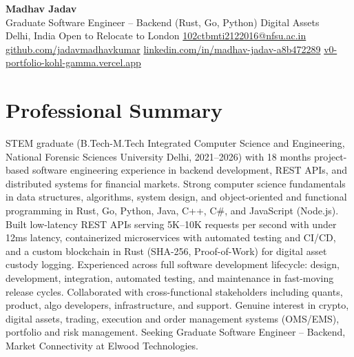 \documentclass[9pt,letterpaper]{article}
\begin{document}
\begin{center}
{\LARGE \textbf{Madhav Jadav}}\\[2pt]
{\small Graduate Software Engineer -- Backend (Rust, Go, Python) \textbar{} Digital Assets}\\[2pt]
{\small Delhi, India \textbar{} Open to Relocate to London \textbar{} \href{mailto:102ctbmti2122016@nfsu.ac.in}{102ctbmti2122016@nfsu.ac.in}}\\[2pt]
{\small \href{https://github.com/jadavmadhavkumar}{github.com/jadavmadhavkumar} \textbar{} \href{https://www.linkedin.com/in/madhav-jadav-a8b472289}{linkedin.com/in/madhav-jadav-a8b472289} \textbar{} \href{http://v0-portfolio-kohl-gamma.vercel.app}{v0-portfolio-kohl-gamma.vercel.app}}\\
\end{center}

\section{Professional Summary}
STEM graduate (B.Tech-M.Tech Integrated Computer Science and Engineering, National Forensic Sciences University Delhi, 2021--2026) with 18 months project-based software engineering experience in backend development, REST APIs, and distributed systems for financial markets. Strong computer science fundamentals in data structures, algorithms, system design, and object-oriented and functional programming in Rust, Go, Python, Java, C++, C\#, and JavaScript (Node.js). Built low-latency REST APIs serving 5K--10K requests per second with under 12ms latency, containerized microservices with automated testing and CI/CD, and a custom blockchain in Rust (SHA-256, Proof-of-Work) for digital asset custody logging. Experienced across full software development lifecycle: design, development, integration, automated testing, and maintenance in fast-moving release cycles. Collaborated with cross-functional stakeholders including quants, product, algo developers, infrastructure, and support. Genuine interest in crypto, digital assets, trading, execution and order management systems (OMS/EMS), portfolio and risk management. Seeking Graduate Software Engineer -- Backend, Market Connectivity at Elwood Technologies.

\end{document}
